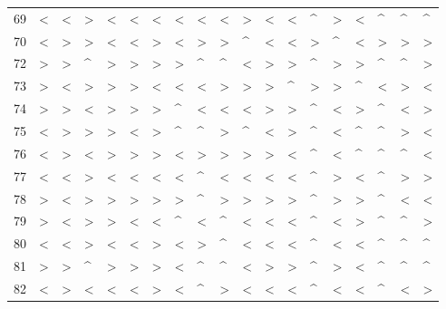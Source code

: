 \begin{tabular}{lllllllllllllllllll}
69  &  < &  < &  > &  < &  < &  < &  < &  < &  < &  > &  < &  < &  \textasciicircum  &  > &  < &  \textasciicircum  &  \textasciicircum  &  \textasciicircum  \\
70  &  < &  > &  > &  < &  < &  > &  < &  > &  > &  \textasciicircum  &  < &  < &  > &  \textasciicircum  &  < &  > &  > &  > \\
72  &  > &  > &  \textasciicircum  &  > &  > &  > &  > &  \textasciicircum  &  \textasciicircum  &  < &  > &  > &  \textasciicircum  &  > &  > &  \textasciicircum  &  \textasciicircum  &  > \\
73  &  > &  < &  > &  > &  > &  < &  < &  < &  > &  > &  > &  \textasciicircum  &  > &  > &  \textasciicircum  &  < &  > &  < \\
74  &  > &  > &  < &  > &  > &  > &  \textasciicircum  &  < &  < &  < &  > &  > &  \textasciicircum  &  < &  > &  \textasciicircum  &  < &  > \\
75  &  < &  > &  > &  > &  < &  > &  \textasciicircum  &  \textasciicircum  &  > &  \textasciicircum  &  < &  > &  \textasciicircum  &  < &  \textasciicircum  &  \textasciicircum  &  > &  < \\
76  &  < &  > &  < &  > &  > &  > &  < &  > &  > &  > &  > &  < &  \textasciicircum  &  < &  \textasciicircum  &  \textasciicircum  &  \textasciicircum  &  < \\
77  &  < &  < &  > &  < &  < &  < &  < &  \textasciicircum  &  < &  < &  < &  < &  \textasciicircum  &  > &  < &  \textasciicircum  &  > &  > \\
78  &  > &  < &  > &  > &  > &  > &  > &  \textasciicircum  &  > &  > &  > &  > &  \textasciicircum  &  > &  > &  \textasciicircum  &  < &  < \\
79  &  > &  < &  > &  > &  < &  < &  \textasciicircum  &  < &  \textasciicircum  &  < &  < &  < &  \textasciicircum  &  < &  > &  \textasciicircum  &  \textasciicircum  &  > \\
80  &  < &  < &  > &  < &  < &  > &  < &  > &  \textasciicircum  &  < &  < &  < &  \textasciicircum  &  < &  < &  \textasciicircum  &  \textasciicircum  &  \textasciicircum  \\
81  &  > &  > &  \textasciicircum  &  > &  > &  > &  < &  \textasciicircum  &  \textasciicircum  &  < &  > &  > &  \textasciicircum  &  > &  < &  \textasciicircum  &  \textasciicircum  &  \textasciicircum  \\
82  &  < &  > &  < &  < &  < &  > &  < &  \textasciicircum  &  > &  < &  < &  < &  \textasciicircum  &  < &  < &  \textasciicircum  &  < &  > \\

\end{tabular}
